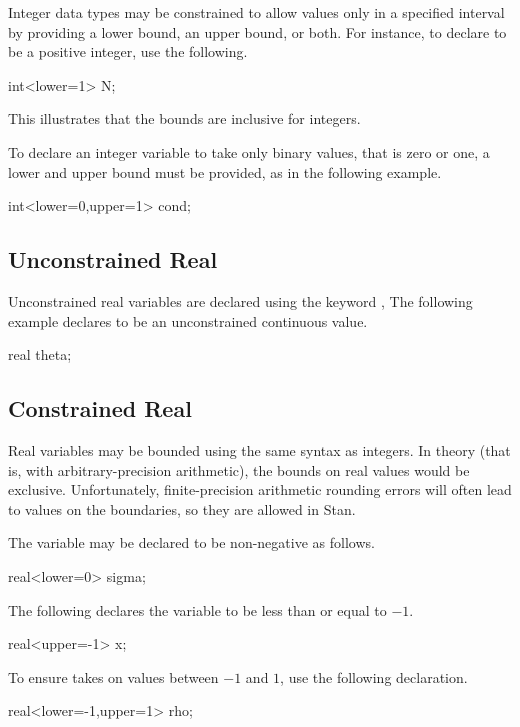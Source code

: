 Integer data types may be constrained to allow values only in a
specified interval by providing a lower bound, an upper bound, or
both.  For instance, to declare  to be a positive integer, use
the following.
%
\begin{stancode}
int<lower=1> N;
\end{stancode}
%
This illustrates that the bounds are inclusive for integers.

To declare an integer variable  to take only binary values,
that is zero or one, a lower and upper bound must be provided, as in
the following example.
%
\begin{stancode}
int<lower=0,upper=1> cond;
\end{stancode}


\subsection{Unconstrained Real}

Unconstrained real variables are declared using the keyword
, The following example declares  to be an
unconstrained continuous value.
%
\begin{stancode}
real theta;
\end{stancode}
%

\subsection{Constrained Real}

Real variables may be bounded using the same syntax as integers.  In
theory (that is, with arbitrary-precision arithmetic), the bounds on
real values would be exclusive.  Unfortunately, finite-precision
arithmetic rounding errors will often lead to values on the
boundaries, so they are allowed in Stan.

The variable  may be declared to be non-negative as follows.
%
\begin{stancode}
real<lower=0> sigma;
\end{stancode}
%
The following declares the variable  to be less than or equal
to $-1$.
%
\begin{stancode}
real<upper=-1> x;
\end{stancode}
%
To ensure  takes on values between $-1$ and $1$, use the
following declaration.
%
\begin{stancode}
real<lower=-1,upper=1> rho;
\end{stancode}
%

